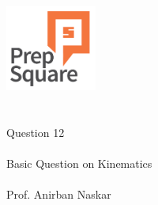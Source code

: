 \documentclass{beamer}
\begin{document}
\begin{center}
\ \\ \ \\
\includegraphics[width=30mm]{Logo-final.png} \\
\ \\ \ \\ 
{\huge Question 12 \\ \ \\ }
{\Large
Basic Question on Kinematics
}
{\large \ \\ \ \\ Prof. Anirban Naskar }
\end{center}
\end{document}
